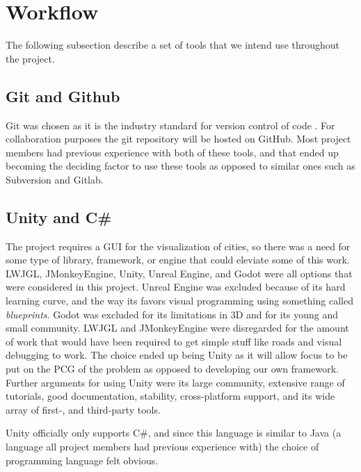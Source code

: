 \section{Workflow}


The following subsection describe a set of tools that we intend use throughout the project.

\subsection{Git and Github}
Git was chosen as it is the industry standard for version control of code \cite{git_industry_standard}.
For collaboration purposes the git repository will be hosted on GitHub.
Most project members had previous experience with both of these tools,
and that ended up becoming the deciding factor to use these tools as opposed to similar ones such as Subversion and Gitlab.

\subsection{Unity and C\#}
The project requires a GUI for the visualization of cities, so there was a need for some type of library, framework, or engine that could eleviate some of this work.
LWJGL, JMonkeyEngine, Unity, Unreal Engine, and Godot were all options that were considered in this project.
Unreal Engine was excluded because of its hard learning curve, and the way its favors visual programming using something called \textit{blueprints}.
Godot was excluded for its limitations in 3D and for its young and small community.
LWJGL and JMonkeyEngine were disregarded for the amount of work that would have been required to get simple stuff like roads and visual debugging to work.
The choice ended up being Unity as it will allow focus to be put on the PCG of the problem as opposed to developing our own framework.
Further arguments for using Unity were its large community, extensive range of tutorials, good documentation, stability, cross-platform support, and its wide array of first-, and third-party tools.

Unity officially only supports C\#, and since this language is similar to Java (a language all project members had previous experience with) the choice of programming language felt obvious.
